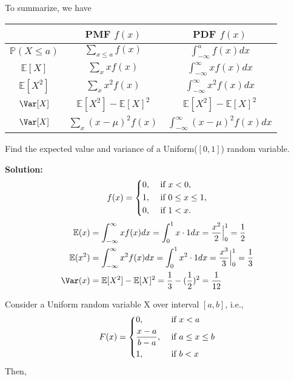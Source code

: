 To summarize, we have 
\begin{table}[H]
    \centering
    \begin{tabular}{c c c}
        \toprule
             & PMF \(f(x)\)  & PDF \(f(x)\)  \\
        \midrule
            \(\mathbb{P}(X \leq a)\)  & \(\sum_{x \leq a} f(x)\)  & \(\int_{-\infty}^a f(x)dx \)   \\[5pt]
            \(\mathbb{E}[X]\) & \(\sum_{x} xf(x)\) & \(\int_{-\infty}^{\infty} xf(x)dx \)  \\[5pt]
            \(\mathbb{E}[X^2]\) & \(\sum_{x} x^2f(x)\) & \(\int_{-\infty}^{\infty} x^2f(x)dx \)  \\[5pt]
            \(\Var[X]\) & \(\mathbb{E}[X^2] - \mathbb{E}[X]^2\)  & \(\mathbb{E}[X^2] - \mathbb{E}[X]^2\)  \\[5pt]
            \(\Var[X]\) & \(\sum_{x} (x - \mu)^2 f(x)\)  & \(\int_{-\infty}^{\infty} (x - \mu)^2 f(x)dx \)  \\[5pt]
        \bottomrule
    \end{tabular}
\end{table} 

\begin{eg}
    Find the expected value and variance of a Uniform(\([0, 1]\)) random variable.

    \textbf{Solution:} 
    \[
        f(x) = \begin{dcases}
            0, &\text{ if } x < 0 ,\\
            1, &\text{ if } 0 \leq x \leq 1 ,\\
            0, &\text{ if } 1 < x.
        \end{dcases}
    \]
    \[
    \begin{aligned}
        \mathbb{E}(x) &= \int_{-\infty} ^{\infty} xf(x)dx = \int_{0}^{1} x \cdot 1 dx = \dfrac{x^2}{2} \Big|_0^1 = \frac{1}{2} \\
        \mathbb{E}(x^2) &= \int_{-\infty} ^{\infty} x^2f(x)dx = \int_{0}^{1} x^2 \cdot 1 dx = \dfrac{x^3}{3} \Big|_0^1 = \frac{1}{3} \\
        \Var(x) &= \mathbb{E}[X^2] - \mathbb{E}[X]^2 = \dfrac{1}{3} - (\dfrac{1}{2})^2 = \dfrac{1}{12}
    \end{aligned}
    \]
\end{eg}

Consider a Uniform random variable X over interval \([a, b]\), i.e., 
\[
    F(x) = \begin{dcases}
        0, &\text{ if } x < a \\
        \frac{x - a}{b - a}, &\text{ if } a \leq x \leq b \\
        1 , &\text{ if } b < x
    \end{dcases}
\]
Then,

